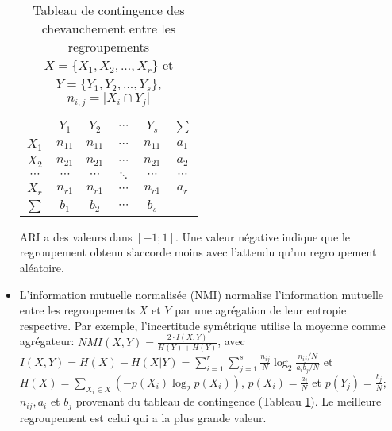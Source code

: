 \begin{itemize}
	\begin{table}[!htb]
		\centering \small
		\begin{tabular}{|c|c|c|c|c|c|}
			\hline
			& $Y_1$    & $Y_2$    & $\cdots$ & $Y_s$    & $\sum$   \\ \hline
			$X_1$    & $n_{11}$ & $n_{11}$ & $\cdots$ & $n_{11}$ & $a_1$    \\ \hline
			$X_2$    & $n_{21}$ & $n_{21}$ & $\cdots$ & $n_{21}$ & $a_2$    \\ \hline
			$\cdots$ & $\cdots$ & $\cdots$ & $\ddots$ & $\cdots$ & $\cdots$ \\ \hline
			$X_r$    & $n_{r1}$ & $n_{r1}$ & $\cdots$ & $n_{r1}$ & $a_r$    \\ \hline
			$\sum$   & $b_1$    & $b_2$    & $\cdots$ & $b_s$    &          \\ \hline
		\end{tabular}
		\caption{Tableau de contingence des chevauchement entre les regroupements $X = \lbrace X_1, X_2, ..., X_r \rbrace$ et $Y = \lbrace Y_1, Y_2, ..., Y_s \rbrace$, $n_{i,j} = \vert X_i \cap Y_j\vert$} \label{tab:similarite:tab-contingence}
	\end{table}
ARI a des valeurs dans $[-1;1]$. Une valeur négative indique que le regroupement obtenu s'accorde moins avec l'attendu qu'un regroupement aléatoire. 
	\item L'information mutuelle normalisée (NMI) \citep{kvalseth1987entropy_NMI,strehl2000nmi, vinh2010clusteringComparison} normalise l'information mutuelle entre les regroupements $X$ et $Y$ par une agrégation de leur entropie respective. Par exemple, l'incertitude symétrique \citep{kvalseth1987entropy_NMI} utilise la moyenne comme agrégateur:  $NMI(X,Y) = \frac{2 \cdot I(X,Y)}{H(Y) + H(Y)} $, 
	avec $I(X,Y) = H(X) - H(X \vert Y) = \sum\limits_{i=1}^{r}\sum\limits_{j=1}^{s} \frac{n_{ij}}{N} \log_2\frac{{n_{ij}}/{N}}{{a_ib_j}/{N}}$ et $H(X) = \sum\limits_{X_i \in X}\left(- p(X_i)\log_2 p(X_i)\right)$,  $p(X_i) = \frac{a_i}{N}$ et $p(Y_j) = \frac{b_j}{N}$; $n_{ij}, a_i$ et $b_j$ provenant du tableau de contingence (Tableau \ref{tab:similarite:tab-contingence}). Le meilleure regroupement est celui qui a la plus grande valeur.
	

\end{itemize}
